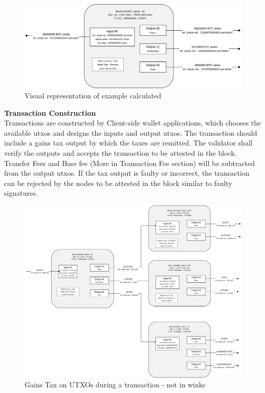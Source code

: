 \documentclass[letterpaper,11pt]{article}
\begin{document}
\begin{center}
\begin{figure}
\includegraphics[width=\textwidth]{gainstaxeg}
\caption{Visual representation of example calculated}
\end{figure}
\end{center}

\textbf{Transaction Construction}\\

Transactions are constructed by Client-side wallet applications, which chooses the available utxos and designs the inputs and output utxos. The transaction should include a gains tax output by which the taxes are remitted. The validator shall verify the outputs and accepts the transaction to be attested in the block. Transfer Fees and Base fee (More in Transaction Fee section) will be subtracted from the output utxos. If the tax output is faulty or incorrect, the transaction can be rejected by the nodes to be attested in the block similar to faulty signatures.\\


\begin{figure}
\begin{center}
\includegraphics[width=\textwidth]{gainstaxutxo}
\caption{Gains Tax on UTXOs during a transaction - not in winks}
\end{center}
\end{figure}
\end{document}
